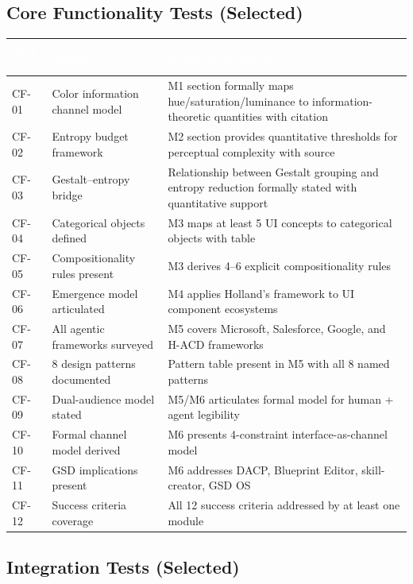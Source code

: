 \documentclass[11pt,letterpaper]{article}
\newcommand{\tableheader}[1]{\textbf{\sffamily\textcolor{white}{#1}}}
\begin{document}
\subsection{Core Functionality Tests (Selected)}

\begin{center}
\begin{tabularx}{\textwidth}{C{1.5cm}L{5cm}X}
\toprule
{}
\tableheader{Test ID} & \tableheader{Verifies} & \tableheader{Expected Behavior} \\
\midrule
CF-01 & Color information channel model & M1 section formally maps hue/saturation/luminance to information-theoretic quantities with citation \\
CF-02 & Entropy budget framework & M2 section provides quantitative thresholds for perceptual complexity with source \\
CF-03 & Gestalt--entropy bridge & Relationship between Gestalt grouping and entropy reduction formally stated with quantitative support \\
CF-04 & Categorical objects defined & M3 maps at least 5 UI concepts to categorical objects with table \\
CF-05 & Compositionality rules present & M3 derives 4--6 explicit compositionality rules \\
CF-06 & Emergence model articulated & M4 applies Holland's framework to UI component ecosystems \\
CF-07 & All agentic frameworks surveyed & M5 covers Microsoft, Salesforce, Google, and H-ACD frameworks \\
CF-08 & 8 design patterns documented & Pattern table present in M5 with all 8 named patterns \\
CF-09 & Dual-audience model stated & M5/M6 articulates formal model for human + agent legibility \\
CF-10 & Formal channel model derived & M6 presents 4-constraint interface-as-channel model \\
CF-11 & GSD implications present & M6 addresses DACP, Blueprint Editor, skill-creator, GSD OS \\
CF-12 & Success criteria coverage & All 12 success criteria addressed by at least one module \\
\bottomrule
\end{tabularx}
\end{center}

\subsection{Integration Tests (Selected)}
\end{document}
